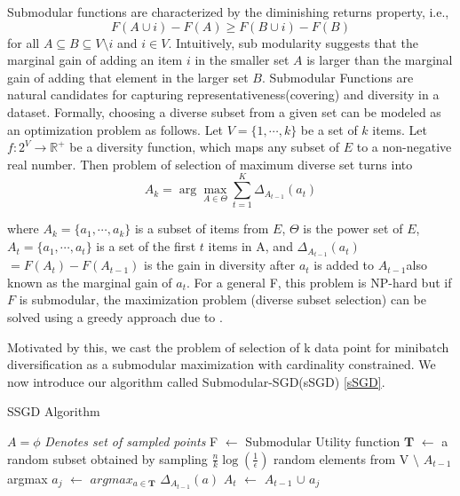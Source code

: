 \documentclass[a4paper,twoside]{iiththesis}
\theoremstyle{definition}
\theoremstyle{definition}
\theoremstyle{remark}
\begin{document}
Submodular functions are characterized by the diminishing returns property, i.e.,
\begin{equation}
F(A \cup {i}) - F(A) \geq F(B \cup {i}) - F(B)
\end{equation}
for all $A \subseteq B \subseteq V \setminus i$ and $i \in V$. Intuitively, sub modularity suggests that the marginal gain of adding an item $i$ in the smaller set $A$ is larger than the marginal gain of adding that element in the larger set $B$. Submodular Functions are natural candidates for capturing representativeness(covering) and diversity in a dataset. Formally, choosing a diverse subset from a given set can be modeled as an optimization problem as follows. Let $V = \{1,\cdots,k\}$ be a set of $k$ items. Let $f : 2^V \rightarrow \mathbb{R}^+$ be a diversity function, which maps any subset of $E$ to a non-negative real number. Then problem of selection of maximum diverse set\cite{ashkan2015optimal} turns into 
\begin{equation}
A_k = \arg\max_{A \in \Theta} \sum_{t=1}^K \Delta_{A_{t-1}}(a_t) \label{Maximisation}
\end{equation}


where $A_k = \{a_1,\cdots,a_k\}$ is a subset of items from $E$, $\Theta$ is the power set of $E$, $A_t = \{a_1,\cdots,a_t\}$ is a set of the first $t$ items in A, 
and $\Delta_{A_{t-1}}(a_t)$ $=F(A_t) - F(A_{t-1})$ is the gain in diversity after $a_t$ is added to $A_{t-1}$also known as the marginal gain of $a_t$. For a general F, this problem is NP-hard but if $F$ is submodular, the maximization problem (diverse subset selection) can be solved using a greedy approach due to \cite{nemhauser}. 

Motivated by this, we cast the problem of selection of k data point for minibatch diversification as a submodular maximization with cardinality constrained. We now introduce our algorithm called Submodular-SGD(sSGD) \ref{sSGD}.

\begin{algorithm}
\caption{SSGD Algorithm}
\label{sSGD-1}
\begin{algorithmic}[1]
\State $A= \phi$ \Comment \textit{Denotes set of sampled points}
\State  F $\leftarrow$ Submodular Utility function
	\State $\mathbf{T}  $ $\leftarrow$ a random subset obtained by sampling $\frac{n}{k} \log(\frac{1}{\epsilon})$ random
	elements from V $\setminus$ $A_{t-1}$
	\State argmax $a_j $ $\leftarrow$ $argmax_{a\in \mathbf{T}}$ $\Delta_{A_{t-1}}(a)$
    \State $A_{t}$ $\leftarrow$ $A_{t -1}$ $\cup$ $a_j$
\EndFor
\end{algorithmic}
\end{algorithm}
\end{document}
